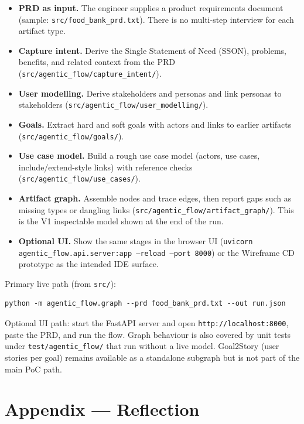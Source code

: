 \documentclass{article}
\begin{document}
\begin{itemize}
  \item \textbf{PRD as input.} The engineer supplies a product requirements
    document (sample: \texttt{src/food\_bank\_prd.txt}). There is no
    multi-step interview for each artifact type.
  \item \textbf{Capture intent.} Derive the Single Statement of Need (SSON),
    problems, benefits, and related context from the PRD
    (\texttt{src/agentic\_flow/capture\_intent/}).
  \item \textbf{User modelling.} Derive stakeholders and personas and link
    personas to stakeholders
    (\texttt{src/agentic\_flow/user\_modelling/}).
  \item \textbf{Goals.} Extract hard and soft goals with actors and links to
    earlier artifacts (\texttt{src/agentic\_flow/goals/}).
  \item \textbf{Use case model.} Build a rough use case model (actors, use
    cases, include/extend-style links) with reference checks
    (\texttt{src/agentic\_flow/use\_cases/}).
  \item \textbf{Artifact graph.} Assemble nodes and trace edges, then report
    gaps such as missing types or dangling links
    (\texttt{src/agentic\_flow/artifact\_graph/}). This is the V1 inspectable
    model shown at the end of the run.
  \item \textbf{Optional UI.} Show the same stages in the browser UI
    (\texttt{uvicorn agentic\_flow.api.server:app --reload --port 8000}) or the
    Wireframe CD prototype as the intended IDE surface.
\end{itemize}

Primary live path (from \texttt{src/}):

\begin{verbatim}
python -m agentic_flow.graph --prd food_bank_prd.txt --out run.json
\end{verbatim}

Optional UI path: start the FastAPI server and open
\texttt{http://localhost:8000}, paste the PRD, and run the flow. Graph behaviour
is also covered by unit tests under \texttt{test/agentic\_flow/} that run
without a live model. Goal2Story (user stories per goal) remains available as a
standalone subgraph but is not part of the main PoC path.

\newpage{}

\section*{Appendix --- Reflection}
\end{document}
